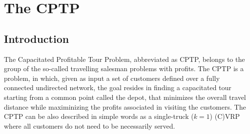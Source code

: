 \chapter{The CPTP}
\label{sec:cptp-chapter}

\section{Introduction}
\label{sec:cptp-intro}

The Capacitated Profitable Tour Problem, abbreviated as CPTP,
belongs to the group of the so-called travelling salesman
problems with profits.
The CPTP is a problem, in which, given as input a set of customers
defined over a fully connected undirected network, the goal resides in finding
a capacitated tour starting from a common point called the depot,
that minimizes the overall travel distance while maximinizing
the profits associated in visiting the customers.
The CPTP can be also described in simple words
as a single-truck ($k = 1$) (C)VRP where all customers
do not need to be necessarily served.


